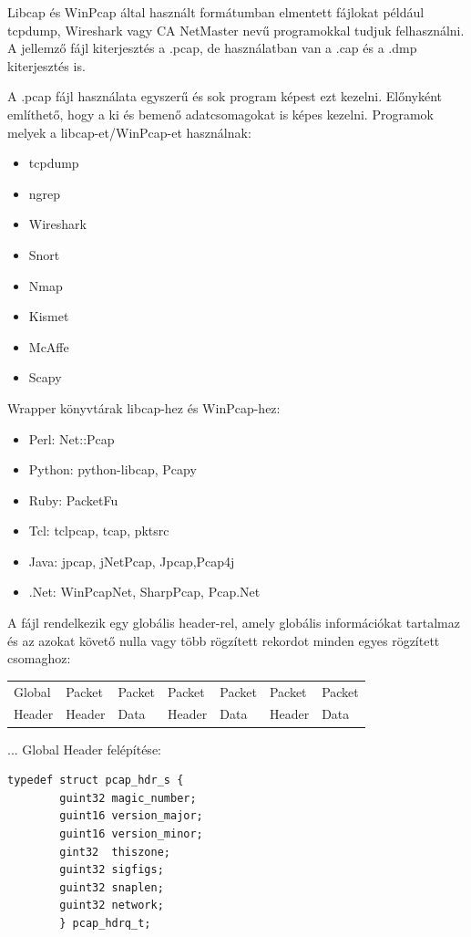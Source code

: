 \documentclass[a4paper,12pt,oneside]{report}
\begin{document}
Libcap és WinPcap által használt formátumban elmentett fájlokat például 
tcpdump, Wireshark vagy CA NetMaster nevű programokkal tudjuk felhasználni.
A jellemző fájl kiterjesztés a .pcap, de használatban van a .cap és a .dmp 
kiterjesztés is.

A .pcap fájl használata egyszerű és sok program képest ezt kezelni.
Előnyként említhető, hogy a ki és bemenő adatcsomagokat is képes kezelni.
\newpage
Programok melyek a libcap-et/WinPcap-et használnak:

\begin{itemize}
	\itemsep0em
		\item tcpdump
		\item ngrep
		\item Wireshark
		\item Snort
		\item Nmap
		\item Kismet
		\item McAffe
		\item Scapy
\end{itemize}

Wrapper könyvtárak libcap-hez és WinPcap-hez:
\begin{itemize}
\itemsep0em
		\item Perl: Net::Pcap
		\item Python: python-libcap, Pcapy
		\item Ruby: PacketFu
		\item Tcl: tclpcap, tcap, pktsrc
		\item Java: jpcap, jNetPcap, Jpcap,Pcap4j
		\item .Net: WinPcapNet, SharpPcap, Pcap.Net
\end{itemize}

A fájl rendelkezik egy globális header-rel, amely globális információkat 
tartalmaz és az azokat követő nulla vagy több rögzített rekordot minden egyes 
rögzített csomaghoz:
\\

\begin{tabular}{|l|l|l|l|l|l|l|}
\hline
	Global & Packet & Packet & Packet & Packet & Packet & Packet\\
	Header & Header & Data & Header & Data & Header & Data\\
\hline
\end{tabular}
...
\newpage
Global Header felépítése:

\begin{lstlisting}
typedef struct pcap_hdr_s {
		guint32 magic_number;
		guint16 version_major;
		guint16 version_minor;
		gint32  thiszone;
		guint32 sigfigs;
		guint32 snaplen;
		guint32 network;
		} pcap_hdrq_t;
\end{lstlisting}
		
\end{document}
